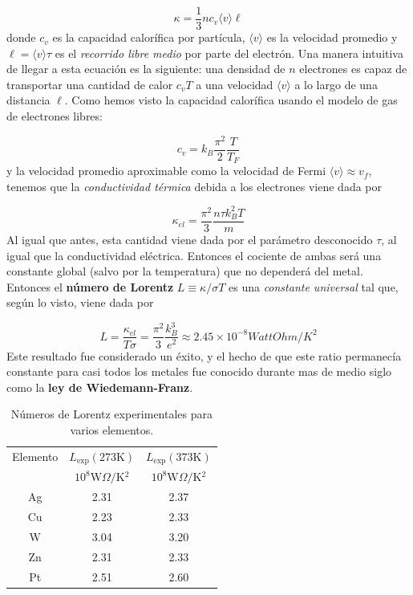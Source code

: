 \begin{equation}
	\kappa = \frac{1}{3} n c_v \langle v \rangle  \ell
\end{equation}
donde $c_v$ es la capacidad calorífica por partícula, $\langle v \rangle $ es la velocidad promedio y $\ell = \langle v \rangle \tau$ es el \textit{recorrido libre medio} por parte del electrón. Una manera intuitiva de llegar a esta ecuación es la siguiente: una densidad de $n$ electrones es capaz  de transportar una cantidad de calor $c_v T$ a una velocidad $\langle v \rangle $ a lo largo de una distancia $\ell$. Como hemos visto la capacidad calorífica usando el modelo de gas de electrones libres:

\begin{equation*}
	c_v = k_B  \frac{\pi^2}{2}  \frac{ T}{T_F} 
\end{equation*}
y la velocidad promedio aproximable como la velocidad de Fermi $\langle v \rangle \approx v_f$, tenemos que la \textit{conductividad térmica} debida a los electrones viene dada por

\begin{equation}
	\kappa_{el} = \frac{\pi^2}{3} \frac{n \tau k_B^2 T}{m}
\end{equation}
Al igual que antes, esta cantidad viene dada por el parámetro desconocido $\tau$, al igual que la conductividad eléctrica. Entonces el cociente de ambas será una constante global (salvo por la temperatura) que no dependerá del metal. Entonces el \textbf{número de Lorentz} $L\equiv \kappa/\sigma T$ es una \textit{constante universal} tal que, según lo visto, viene dada por

\begin{equation}
	L = \frac{\kappa_{el}}{T \sigma} = \frac{\pi^2}{3} \frac{k_B^3}{e^2} \approx 2.45 \times 10^{-8} \unit{WattOhm/K^2}
\end{equation}
Este resultado fue considerado un éxito, y el hecho de que este ratio permanecía constante para casi todos los metales fue conocido durante mas de medio siglo como la \textbf{ley de Wiedemann-Franz}. 


\begin{table}[h!] \centering
	\begin{tabular}{ccc}
		Elemento & $L_{\text{exp}} (\unit{273 \kelvin})$ & $L_{\text{exp}} (\unit{373 \kelvin})$  \\
		& $10^8\unit{\watt \Omega / \kelvin^2}$ &  $10^8\unit{\watt \Omega / \kelvin^2}$ \\ \hline
		Ag & 2.31 & 2.37 \\
		Cu & 2.23 & 2.33 \\
		W  & 3.04 & 3.20 \\
		Zn & 2.31 & 2.33 \\
		Pt & 2.51 & 2.60
	\end{tabular}	
	\caption{Números de Lorentz experimentales para varios elementos.}
	\label{Tab:06-02}
\end{table}

